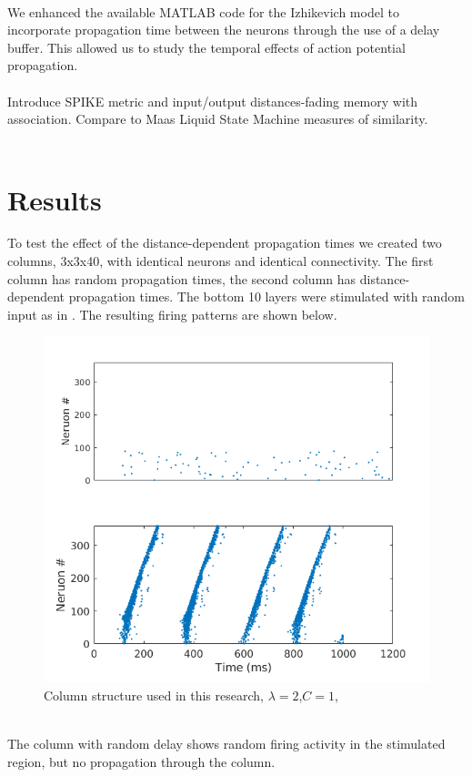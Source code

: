 \documentclass[a4paper,11pt]{article}
\begin{document}
\\
We enhanced the available MATLAB code for the Izhikevich model to incorporate propagation time between the neurons through the use of a delay buffer.
This allowed us to study the temporal effects of action potential propagation.
\\ \\
Introduce SPIKE metric and input/output distances-fading memory with association.
Compare to Maas Liquid State Machine measures of similarity.
\\ \\
\section{Results}
To test the effect of the distance-dependent propagation times we created two columns, 3x3x40,  with identical neurons and identical connectivity.
The first column has random propagation times, the second column has distance-dependent propagation times.
The bottom 10 layers were stimulated with random input as in \cite{izhikevich2003}.
The resulting firing patterns are shown below.
\\
\begin{figure}[ht]
 \caption{Column structure used in this research, $\lambda=2$,$C=1$,}
 \centering
   \includegraphics[width=\textwidth]{fig/DelayCompare_RandInput}
\end{figure}
\\
The column with random delay shows random firing activity in the stimulated region, but no propagation through the column.
\end{document}
